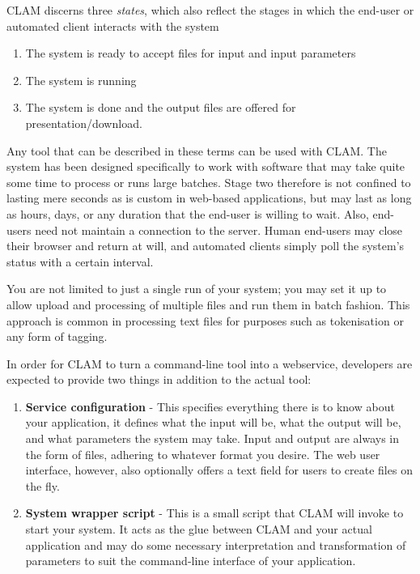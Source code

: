 \documentclass[11pt]{article}
\begin{document}
CLAM discerns three \emph{states}, which also reflect the stages in which
the end-user or automated client interacts with the system

\begin{enumerate}[noitemsep]
  \item The system is ready to accept files for input and input parameters
  \item The system is running
  \item The system is done and the output files are offered for presentation/download.
\end{enumerate}


Any tool that can be described in these terms can be used with CLAM. The system
has been designed specifically to work with software that may take quite some
time to process or runs large batches. Stage two therefore is not confined to
lasting mere seconds as is custom in web-based applications, but may last as
long as hours, days, or any duration that the end-user is willing to wait.
Also, end-users need not maintain a connection to the server. Human end-users
may close their browser and return at will, and automated clients simply poll the
system's status with a certain interval.

You are not limited to just a single run of your system; you may set it up to
allow upload and processing of multiple files and run them in batch fashion.
This approach is common in processing text files for purposes such as
tokenisation or any form of tagging.

In order for CLAM to turn a command-line tool into a webservice, developers are
expected to provide two things in addition to the actual tool: 

\begin{enumerate}
  \item \textbf{Service configuration} - This specifies everything there is to
    know about your application, it defines what the input will be, what
    the output will be, and what parameters the system may take. Input and output
    are always in the form of files, adhering to whatever format you desire. The web user interface, however, also
    optionally offers a text field for users to create files on the fly. 
    
  \item \textbf{System wrapper script} - This is a small script that CLAM will
    invoke to start your system. It acts as the glue between CLAM and your
    actual application and may do some necessary interpretation and
    transformation of parameters to suit the command-line interface of your
    application.
\end{enumerate}
\end{document}
